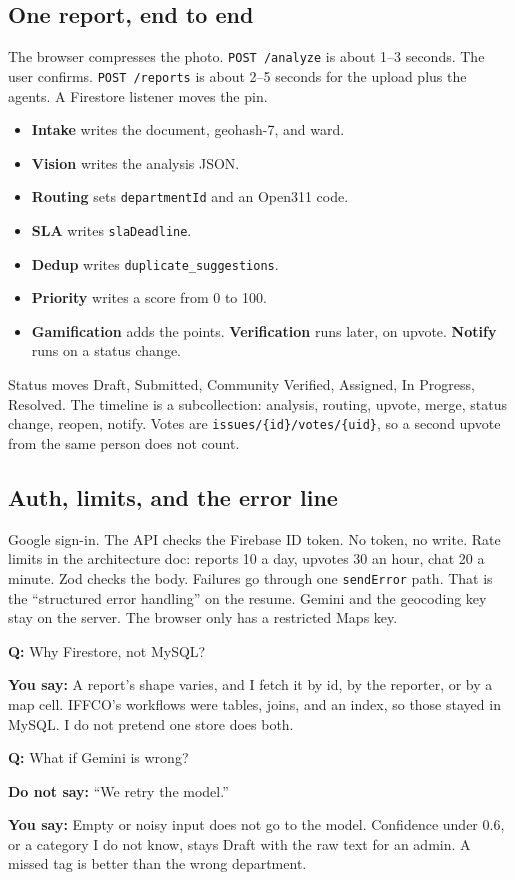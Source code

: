 \documentclass[a4paper,9.5pt]{extarticle}
\newcommand{\Q}[1]{\par\vspace{1.2pt}\noindent\textcolor{hot}{\textbf{Q:} #1}\par}
\newcommand{\Say}[1]{\noindent\textcolor{ok}{\textbf{You say:} #1}\par}
\newcommand{\No}[1]{\noindent\textcolor{muted}{\textbf{Do not say:} #1}\par}
\begin{document}
\subsection{One report, end to end}
The browser compresses the photo. \texttt{POST /analyze} is about 1--3 seconds. The user confirms. \texttt{POST /reports} is about 2--5 seconds for the upload plus the agents. A Firestore listener moves the pin.
\begin{itemize}
  \item \textbf{Intake} writes the document, geohash-7, and ward.
  \item \textbf{Vision} writes the analysis JSON.
  \item \textbf{Routing} sets \texttt{departmentId} and an Open311 code.
  \item \textbf{SLA} writes \texttt{slaDeadline}.
  \item \textbf{Dedup} writes \texttt{duplicate\_suggestions}.
  \item \textbf{Priority} writes a score from 0 to 100.
  \item \textbf{Gamification} adds the points. \textbf{Verification} runs later, on upvote. \textbf{Notify} runs on a status change.
\end{itemize}
Status moves Draft, Submitted, Community Verified, Assigned, In Progress, Resolved. The timeline is a subcollection: analysis, routing, upvote, merge, status change, reopen, notify. Votes are \texttt{issues/\{id\}/votes/\{uid\}}, so a second upvote from the same person does not count.

\subsection{Auth, limits, and the error line}
Google sign-in. The API checks the Firebase ID token. No token, no write. Rate limits in the architecture doc: reports 10 a day, upvotes 30 an hour, chat 20 a minute. Zod checks the body. Failures go through one \texttt{sendError} path. That is the ``structured error handling'' on the resume. Gemini and the geocoding key stay on the server. The browser only has a restricted Maps key.

\Q{Why Firestore, not MySQL?}
\Say{A report's shape varies, and I fetch it by id, by the reporter, or by a map cell. IFFCO's workflows were tables, joins, and an index, so those stayed in MySQL. I do not pretend one store does both.}

\Q{What if Gemini is wrong?}
\No{``We retry the model.''}
\Say{Empty or noisy input does not go to the model. Confidence under 0.6, or a category I do not know, stays Draft with the raw text for an admin. A missed tag is better than the wrong department.}
\end{document}
